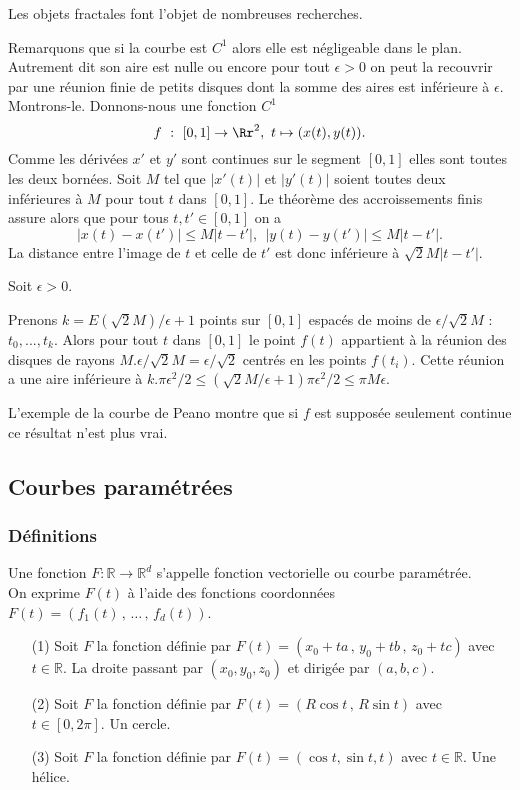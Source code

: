 \documentclass[12pt, class=report,crop=false]{standalone}
\begin{document}
Les objets fractales font l'objet de nombreuses recherches.

Remarquons que si la courbe est $C^1$ alors elle est négligeable dans le plan. Autrement dit son aire est nulle ou encore pour tout $\epsilon>0$ on peut la recouvrir par une réunion finie de petits disques dont la somme des aires est inférieure \`a $\epsilon$. Montrons-le.
Donnons-nous une fonction $C^1$
$$
f\ :\ [0,1]\rightarrow \Rr^2,\ t\mapsto (x(t),y(t)).
$$
Comme les dérivées $x'$ et $y'$ sont continues sur le segment $[0,1]$ elles sont toutes les deux bornées. Soit $M$ tel que $|x'(t)|$ et $|y'(t)|$ soient toutes deux inférieures \`a $M$ pour tout $t$ dans $[0,1]$. 
Le théor\`eme des accroissements finis assure alors que pour tous $t,t'\in[0,1]$ on a  
$$
|x(t)-x(t')|\leq M|t-t'|,\ \ |y(t)-y(t')|\leq M|t-t'|.
$$
La distance entre l'image de $t$ et celle de $t'$ est donc inférieure \`a $\sqrt{2}M|t-t'|$. 

Soit $\epsilon>0$.

Prenons  $k=E(\sqrt{2}M)/\epsilon+1$ points sur $[0,1]$ espacés de moins de $\epsilon/\sqrt{2}M$ : $t_0,...,t_k$.
Alors pour tout $t$ dans $[0,1]$ le point $f(t)$ appartient \`a la réunion des disques de rayons $M.\epsilon/\sqrt{2}M=\epsilon/\sqrt{2}$ centrés en les points $f(t_i)$. Cette réunion a une aire inférieure \`a $k.\pi\epsilon^2/2\leq (\sqrt{2}M/\epsilon+1)\pi\epsilon^2/2\leq \pi M\epsilon$. 

L'exemple de la courbe de Peano montre que si $f$ est supposée seulement continue ce résultat n'est plus vrai. 

\subsection{Courbes paramétrées}
\subsubsection{Définitions}
\begin{definition}
Une fonction $F : \mathbb{R} \rightarrow \mathbb{R}^d$ s'appelle fonction vectorielle ou courbe paramétrée.\\
On exprime $F(t)$ \`a l'aide des fonctions coordonnées $F(t) = (f_{1}(t) \,,\, \dots \,,\, f_{d}(t))$.
\end{definition}

\begin{enumerate}
\item[(1)] Soit $F$ la fonction définie par $F(t) = (x_{0} + ta\,,\,y_{0} + tb\,,\,z_{0} + tc)$ avec $t\in \mathbb R$. La droite passant par  $(x_0,y_0,z_0)$ et dirigée par $(a,b,c)$.
\item[(2)] Soit $F$ la fonction définie par $F(t) = (R \cos t\,,\,R \sin t)$ avec $t\in [0,2\pi]$. Un cercle.
\item[(3)] Soit $F$ la fonction définie par $F(t) = ( \cos t, \sin t, t)$ avec $t\in \mathbb R$. Une hélice.
\end{enumerate}
\end{document}
